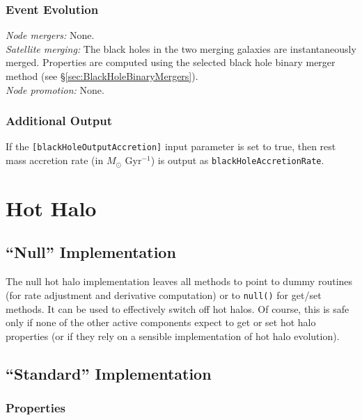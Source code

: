 \subsubsection{Event Evolution}

\noindent\emph{Node mergers:} None.\\

\noindent\emph{Satellite merging:} The black holes in the two merging galaxies are instantaneously merged. Properties are computed using the selected black hole binary merger method (see \S\ref{sec:BlackHoleBinaryMergers}).\\

\noindent\emph{Node promotion:} None.\\

\subsubsection{Additional Output}

If the {\tt [blackHoleOutputAccretion]} input parameter is set to true, then rest mass accretion rate (in $M_\odot$ Gyr$^{-1}$) is output as {\tt blackHoleAccretionRate}.

\section{Hot Halo}

\subsection{``Null'' Implementation}

The null hot halo implementation leaves all methods to point to dummy routines (for rate adjustment and derivative computation) or to {\tt null()} for get/set methods. It can be used to effectively switch off hot halos. Of course, this is safe only if none of the other active components expect to get or set hot halo properties (or if they rely on a sensible implementation of hot halo evolution).

\subsection{``Standard'' Implementation}

\subsubsection{Properties}

